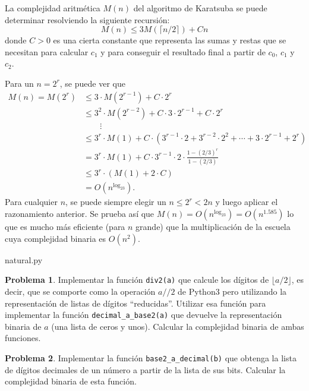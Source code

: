 \documentclass[a4paper, 11pt]{article}
\newcounter{numerodetema}
\theoremstyle{plain}
\theoremstyle{definition}
\newtheorem{prob}{Problema}[numerodetema]
\begin{document}
\bigskip

La complejidad aritmética $M(n)$ del algoritmo de Karatsuba se puede determinar
resolviendo la siguiente recursión:
\[
   M(n)\leq 3 M(\lceil n/2\rceil) + Cn
\]
donde $C>0$ es una cierta constante que representa las sumas y restas que se
necesitan para calcular $c_1$ y para conseguir el resultado final a partir de
$c_0$, $c_1$ y $c_2$.

\bigskip

Para un $n=2^r$, se puede ver que
\[
\begin{aligned}
   M(n)=M(2^r) &\leq 3\cdot M(2^{r-1})+C\cdot 2^r \\
          &\leq 3^2\cdot M(2^{r-2})+C\cdot 3\cdot 2^{r-1}+C\cdot 2^r \\
          &\qquad\vdots \\
          &\leq 3^r\cdot M(1)+C\cdot
            (3^{r-1}\cdot 2+3^{r-2}\cdot 2^2+\cdots+3\cdot 2^{r-1}+2^r) \\
          &=3^r\cdot M(1) + C\cdot 3^{r-1}\cdot 2\cdot\frac{1-(2/3)^r}{1-(2/3)} \\
          &\leq 3^r\cdot (M(1) + 2\cdot C) \\
          &=O(n^{\log_23}).
\end{aligned}
\]
Para cualquier $n$, se puede siempre elegir un $n\leq 2^r<2n$ y luego aplicar el
razonamiento anterior. Se prueba así que $M(n)=O(n^{\log_23})=O(n^{1.585})$ lo
que es mucho más eficiente (para $n$ grande) que la multiplicación de la escuela
cuya complejidad binaria es $O(n^2)$.

\bigskip


{natural.py}

\bigskip

\begin{prob}\label{prob-b10-b2}
Implementar la función \texttt{div2(a)} que calcule los dígitos de
$\lfloor a/2\rfloor$, es decir, que se comporte como la operación $a//2$ de
Python3 pero utilizando la representación de listas de dígitos ``reducidas''.
Utilizar esa función para implementar la función \texttt{decimal\_a\_base2(a)}
que devuelve la representación binaria de $a$ (una lista de ceros y unos).
Calcular la complejidad binaria de ambas funciones.
\end{prob}

\begin{prob}
Implementar la función \texttt{base2\_a\_decimal(b)} que obtenga la lista de
dígitos decimales de un número a partir de la lista de sus bits. Calcular la
complejidad binaria de esta función.
\end{prob}
\end{document}
